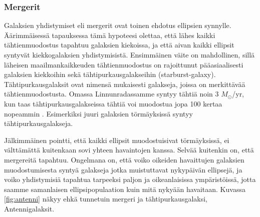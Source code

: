 \documentclass[12pt,a4paper]{article}
\begin{document}
\subsubsection{Mergerit} \label{mergerit}

Galaksien yhdistymiset eli mergerit ovat toinen ehdotus ellipsien synnylle. Äärimmäisessä tapauksessa tämä hypoteesi olettaa, että lähes kaikki tähtienmuodostus tapahtuu galaksien kiekoissa, ja että aivan kaikki ellipsit syntyvät kiekkogalaksien yhdistymisistä. Ensimmäinen väite on mahdollinen, sillä läheisen maailmankaikkeuden tähtienmuodostus on rajoittunut pääasiaalisesti galaksien kiekkoihin sekä tähtipurkausgalakseihin (starburst-galaxy). Tähtipurkausgalaksit ovat nimensä mukaisesti galakseja, joissa on merkittävää tähtienmuodostusta. Omassa Linnunradassamme syntyy tähtiä noin 3 $M_\odot$/yr, kun taas tähtipurkausgalakseissa tähtiä voi muodostua jopa 100 kertaa nopeammin \citep{extragal}. Esimerkiksi juuri galaksien törmäyksissä syntyy tähtipurkausgalakseja.

Jälkimmäinen pointti, että kaikki ellipsit muodostuisivat törmäyksissä, ei välttämättä kuitenkaan sovi yhteen havaintojen kanssa. Selvää kuitenkin on, että mergereitä tapahtuu. Ongelmana on, että voiko oikeiden havaittujen galaksien muodostumisesta syntyä galakseja jotka muistuttavat nykypäivän ellipsejä, ja voiko yhdistymisiä tapahtua tarpeeksi paljon ja oikeanlaisissa ympäristöissä, jotta saamme samanlaisen ellipsipopulaation kuin mitä nykyään havaitaan. Kuvassa \ref{fig:antenni} näkyy ehkä tunnetuin mergeri ja tähtipurkausgalaksi, Antennigalaksit.
\end{document}
